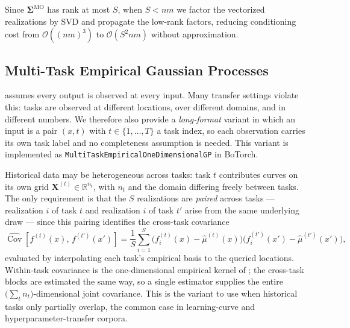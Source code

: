 \documentclass{article}
\newcommand{\K}{S}
\newcommand{\bX}{\mathbf{X}}
\begin{document}
Since $\boldsymbol{\Sigma}^{\text{MO}}$ has rank at most $\K$, when $\K < nm$ we factor the vectorized realizations by SVD and propagate the low-rank factors, reducing conditioning cost from $\mathcal{O}((nm)^3)$ to $\mathcal{O}(\K^2 nm)$ without approximation.

\subsection{Multi-Task Empirical Gaussian Processes}
\label{apd:multitask}

 assumes every output is observed at every input. Many transfer settings violate this: tasks are observed at different locations, over different domains, and in different numbers. We therefore also provide a \emph{long-format} variant in which an input is a pair $(x,t)$ with $t\in\{1,\dots,T\}$ a task index, so each observation carries its own task label and no completeness assumption is needed. This variant is implemented as \texttt{MultiTaskEmpiricalOneDimensionalGP} in BoTorch.

Historical data may be heterogeneous across tasks: task $t$ contributes curves on its own grid $\bX^{(t)}\in\mathbb{R}^{n_t}$, with $n_t$ and the domain differing freely between tasks. The only requirement is that the $\K$ realizations are \emph{paired} across tasks --- realization $i$ of task $t$ and realization $i$ of task $t'$ arise from the same underlying draw --- since this pairing identifies the cross-task covariance
\begin{equation}
    \widehat{\operatorname{Cov}}\!\left[f^{(t)}(x),\, f^{(t')}(x')\right]
    = \frac{1}{\K}\sum_{i=1}^{\K}
      \big(f^{(t)}_i(x) - \hat\mu^{(t)}(x)\big)
      \big(f^{(t')}_i(x') - \hat\mu^{(t')}(x')\big),
\end{equation}
evaluated by interpolating each task's empirical basis to the queried locations. Within-task covariance is the one-dimensional empirical kernel of ; the cross-task blocks are estimated the same way, so a single estimator supplies the entire $\big(\sum_t n_t\big)$-dimensional joint covariance. This is the variant to use when historical tasks only partially overlap, the common case in learning-curve and hyperparameter-transfer corpora.
\end{document}
